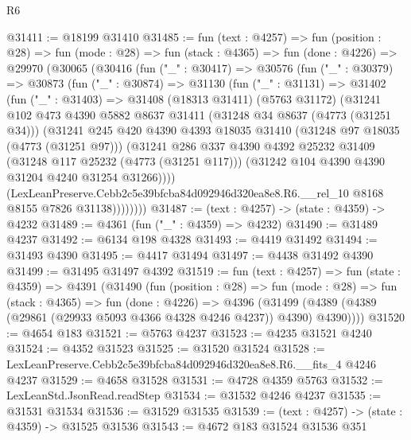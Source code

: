 \begin{lexlean}{R6}
\begin{coremodule}
@31411 := @18199 @31410
@31485 := fun (text : @4257) =>
  fun (position : @28) =>
  fun (mode : @28) =>
  fun (stack : @4365) =>
  fun (done : @4226) =>
  @29970
    (@30065
      (@30416
        (fun ("_" : @30417) =>
        @30576
          (fun ("_" : @30379) =>
          @30873
            (fun ("_" : @30874) =>
            @31130
              (fun ("_" : @31131) =>
              @31402
                (fun ("_" : @31403) =>
                @31408
                  (@18313 @31411)
                  (@5763 @31172)
                  (@31241
                    @102
                    @473
                    @4390
                    @5882
                    @8637
                    @31411
                    (@31248 @34 @8637 (@4773 (@31251 @34)))
                    (@31241
                      @245
                      @420
                      @4390
                      @4393
                      @18035
                      @31410
                      (@31248 @97 @18035 (@4773 (@31251 @97)))
                      (@31241
                        @286
                        @337
                        @4390
                        @4392
                        @25232
                        @31409
                        (@31248 @117 @25232 (@4773 (@31251 @117)))
                        (@31242 @104 @4390 @4390 @31204 @4240 @31254 @31266))))
                  (LexLeanPreserve.Cebb2c5e39bfcba84d092946d320ea8e8.R6.__rel_10
                    @8168
                    @8155
                    @7826
                    @31138))))))))
@31487 := (text : @4257) -> (state : @4359) -> @4232
@31489 := @4361 (fun ("_" : @4359) => @4232)
@31490 := @31489 @4237
@31492 := @6134 @198 @4328
@31493 := @4419 @31492
@31494 := @31493 @4390
@31495 := @4417 @31494
@31497 := @4438 @31492 @4390
@31499 := @31495 @31497 @4392
@31519 := fun (text : @4257) =>
  fun (state : @4359) =>
  @4391
    (@31490
      (fun (position : @28) =>
      fun (mode : @28) =>
      fun (stack : @4365) =>
      fun (done : @4226) =>
      @4396 (@31499 (@4389 (@4389 (@29861 (@29933 @5093 @4366 @4328 @4246 @4237)) @4390) @4390))))
@31520 := @4654 @183
@31521 := @5763 @4237
@31523 := @4235 @31521 @4240
@31524 := @4352 @31523
@31525 := @31520 @31524
@31528 := LexLeanPreserve.Cebb2c5e39bfcba84d092946d320ea8e8.R6.__fits_4 @4246 @4237
@31529 := @4658 @31528
@31531 := @4728 @4359 @5763
@31532 := LexLeanStd.JsonRead.readStep
@31534 := @31532 @4246 @4237
@31535 := @31531 @31534
@31536 := @31529 @31535
@31539 := (text : @4257) -> (state : @4359) -> @31525 @31536
@31543 := @4672 @183 @31524 @31536 @351

\end{coremodule}
\end{lexlean}
